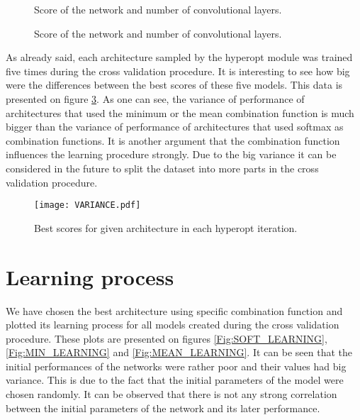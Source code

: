 \documentclass[a4paper,10pt]{report}
\begin{document}
     \begin{figure}
      \begin{minipage}{\textwidth}
	\caption{Score of the network and number of convolutional layers.}\label{Fig:MIN_LAYERS_SCORE}
      \end{minipage}
     \end{figure}
     
     \begin{figure}
      \begin {minipage}{\textwidth}
	\caption{Score of the network and number of convolutional layers.}\label{Fig:SOFT_LAYERS_SCORE}
      \end{minipage}
    \end{figure}
    

    As already said, each architecture sampled by the hyperopt module was trained five times during the cross validation procedure. It is interesting to see how big were the differences between the best scores of these five models. This data is presented on figure \ref{VARIANCE}. As one can see, the variance of performance of architectures that used the minimum or the mean combination function is much bigger than the variance of performance of architectures that used softmax as combination functions. It is another argument that the combination function influences the learning procedure strongly. Due to the big variance it can be considered in the future to split the dataset into more parts in the cross validation procedure.

      \begin{figure}[h!]
	\centering
	\texttt{[image: VARIANCE.pdf]}
	\caption{Best scores for given architecture in each hyperopt iteration.}
	\label{VARIANCE}
      \end{figure}
      
    \section{Learning process}

    We have chosen the best architecture using specific combination function and plotted its learning process for all models created during the cross validation procedure. These plots are presented on figures \ref{Fig:SOFT_LEARNING}, \ref{Fig:MIN_LEARNING} and \ref{Fig:MEAN_LEARNING}. It can be seen that the initial performances of the networks were rather poor and their values had big variance. This is due to the fact that the initial parameters of the model were chosen randomly. It can be observed that there is not any strong correlation between the initial parameters of the network and its later performance. 
    
\end{document}
